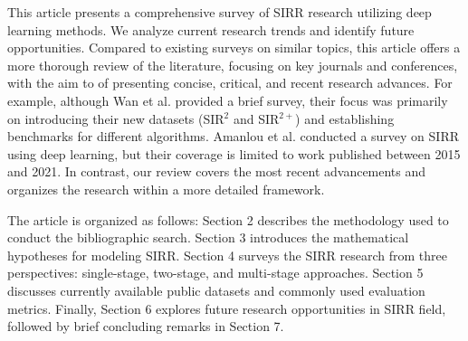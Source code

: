 This article presents a comprehensive survey of SIRR research utilizing deep learning methods. We analyze current research trends and identify future opportunities. Compared to existing surveys on similar topics, this article offers a more thorough review of the literature, focusing on key journals and conferences, with the aim to of presenting concise, critical, and recent research advances. For example, although Wan et al.\cite{wan2017benchmarking, wan2022benchmarking} provided a brief survey, their focus was primarily on introducing their new datasets (SIR$^2$ and SIR$^{2+}$) and establishing benchmarks for different algorithms. Amanlou et al.\cite{amanlou2022single} conducted a survey on SIRR using deep learning, but their coverage is limited to work published between 2015 and 2021. In contrast, our review covers the most recent advancements and organizes the research within a more detailed framework.

The article is organized as follows: Section 2 describes the methodology used to conduct the bibliographic search. Section 3 introduces the mathematical hypotheses for modeling SIRR. Section 4 surveys the SIRR research from three perspectives: single-stage, two-stage, and multi-stage approaches. Section 5 discusses currently available public datasets and commonly used evaluation metrics. Finally, Section 6 explores future research opportunities in SIRR field, followed by brief concluding remarks in Section 7.